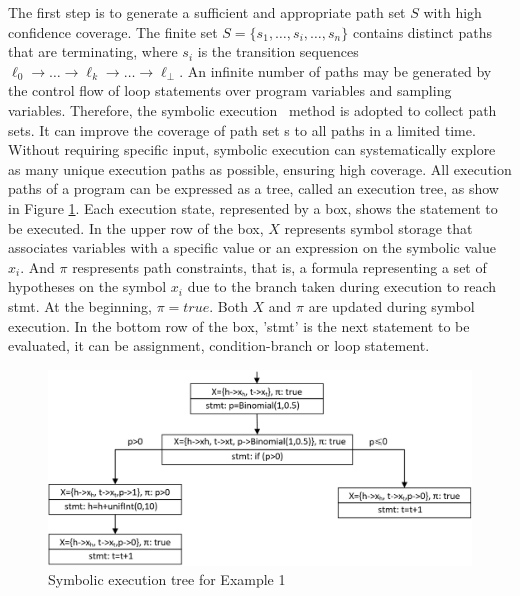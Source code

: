 \documentclass[runningheads]{llncs}
\begin{document}
The first step is to generate a sufficient and appropriate path set $S$ with high confidence coverage. The finite set $S=\{s_1,\dots,s_i,\dots,s_n\}$ contains distinct paths that are terminating, where $s_i$ is the transition sequences $\ell_0 \to \dots \to \ell_k \to \dots \to \ell_{\bot}$. An infinite number of paths may be generated by the control flow of loop statements over program variables and sampling variables. Therefore, the symbolic execution~\cite{Geldenhuys2012symbolic} method is adopted to collect path sets. It can improve the coverage of path set s to all paths in a limited time. Without requiring specific input, symbolic execution can systematically explore as many unique execution paths as possible, ensuring high coverage. All execution paths of a program can be expressed as a tree, called an execution tree, as show in Figure \ref{executionTree}. Each execution state, represented by a box, shows the statement to be executed. In the upper row of the box, $X$ represents symbol storage that associates variables with a specific value or an expression on the symbolic value $x_i$. And $\pi$ respresents path constraints, that is, a formula representing a set of hypotheses on the symbol $x_i$ due to the branch taken during execution to reach stmt. At the beginning, $\pi=true$. Both $X$ and $\pi$ are updated during symbol execution. In the bottom row of the box, 'stmt' is the next statement to be evaluated, it can be assignment, condition-branch or loop statement.

\begin{figure}[h]
	\centering
	\includegraphics[scale=0.6]{img/executionTree}
	\caption{Symbolic execution tree for Example 1}
	\label{executionTree}
\end{figure}
\end{document}
